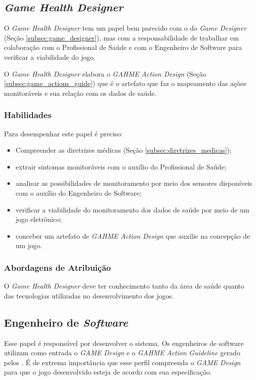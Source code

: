\subsection{\textit{Game Health Designer}}
O \textit{Game Health Designer} tem um papel bem parecido com o do \textit{Game Designer} (Seção \ref{subsec:game_designer}), mas com a responsabilidade de trabalhar em colaboração com o Profissional de Saúde e com o Engenheiro de Software para verificar a viabilidade do jogo. 

O \textit{Game Health Designer} elabora o \textit{GAHME Action Design} (Seção \ref{subsec:game_actions_guide}) que é o artefato que faz o mapeamento das ações monitoráveis e sua relação com os dados de saúde. 

\subsubsection{Habilidades}
Para desempenhar este papel é preciso:
  \begin{itemize}
	  \item Compreender as diretrizes médicas (Seção \ref{subsec:diretrizes_medicas});
		\item extrair sintomas monitoráveis com o auxílio do Profissional de Saúde;
		\item analisar as possibilidades de monitoramento por meio dos sensores disponíveis com o auxílio do Engenheiro de Software;
		\item verificar a viabilidade do monitoramento dos dados de saúde por meio de um jogo eletrônico;
		\item conceber um artefato de \textit{GAHME Action Design} que auxilie na concepção de um jogo.
  \end{itemize}

\subsubsection{Abordagens de Atribuição}
O \textit{Game Health Designer} deve ter conhecimento tanto da área de saúde quanto das tecnologias utilizadas no desenvolvimento dos jogos.

\subsection{Engenheiro de \textit{Software}}\label{subsec:engenheiro_software}
Esse papel é responsável por desenvolver o sistema. Os engenheiros de software utilizam como entrada o \textit{GAME Design} e o \textit{GAHME Action Guideline} gerado pelos . É de extrema importância que esse perfil compreenda o \textit{GAME Design} para que o jogo desenvolvido esteja de acordo com sua especificação.

